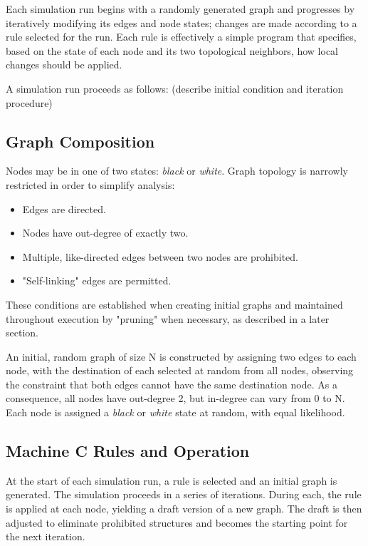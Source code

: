 \documentclass[twoside,twocolumn]{article}
\begin{document}
Each simulation run begins with a randomly generated graph and progresses by
iteratively modifying its edges and node states; changes are made according to a rule selected
for the run. Each rule is effectively a simple program  that specifies, based on the state
of each node and its two topological neighbors, how local changes should be applied.

A simulation run proceeds as follows: (describe initial condition and iteration procedure)

\subsection{Graph Composition}

Nodes may be in one of two states: \textit{black} or \textit{white}.
Graph topology is narrowly restricted in order to simplify analysis:

\begin{itemize}
    \item Edges are directed.
    \item Nodes have out-degree of exactly two.
    \item Multiple, like-directed edges between two nodes are prohibited.
    \item "Self-linking" edges are permitted.
\end{itemize}

These conditions are established when creating initial graphs and maintained
throughout execution by "pruning" when necessary, as described in a later section.

An initial, random graph of size N is constructed by assigning two edges to each node, with
the destination of each selected at random from all nodes, observing the
constraint that both edges cannot have the same destination node. As a consequence,
all nodes have out-degree 2, but in-degree can vary from 0 to N. Each node is assigned
a \textit{black} or \textit{white} state at random, with equal likelihood.

\subsection{Machine \textbf{C} Rules and Operation}

At the start of each simulation run, a rule is selected and an initial graph
is generated.  The simulation proceeds in a series of
iterations. During each, the rule is applied at each node, yielding a draft
version of a new graph. The draft is then adjusted to eliminate
prohibited structures and becomes the starting point for the next iteration.
\end{document}
